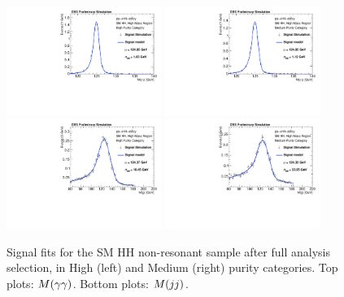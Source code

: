 \begin{figure}[h]
  \centering
  \includegraphics[width=0.45\textwidth]{figures/sec-signals/SMHM_signal_fit_mgg_cat0}\hfil
  \includegraphics[width=0.45\textwidth]{figures/sec-signals/SMHM_signal_fit_mgg_cat1}\hfil
  \includegraphics[width=0.45\textwidth]{figures/sec-signals/SMHM_signal_fit_mjj_cat0}\hfil
  \includegraphics[width=0.45\textwidth]{figures/sec-signals/SMHM_signal_fit_mjj_cat1}\hfil
  \caption{Signal fits for the SM HH non-resonant sample after full analysis selection, in High (left) and Medium (right) purity categories. Top plots: $M(\gamma\gamma)$. Bottom plots: $M(jj)$.}
  \label{fig:sig_highmassSM}
\end{figure}

